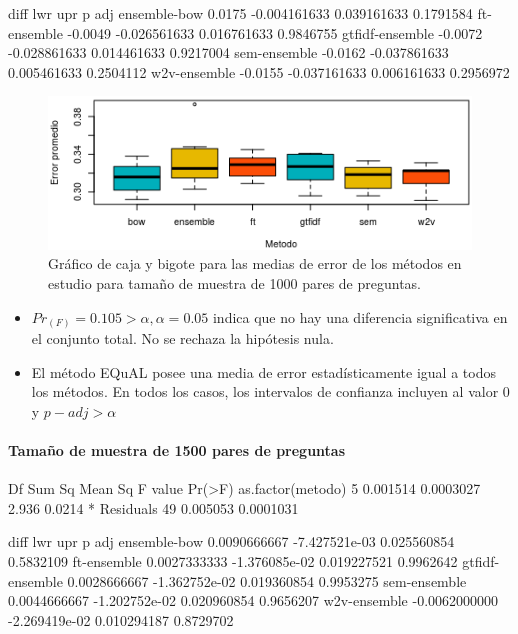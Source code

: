 \begin{rc}
                  diff          lwr         upr     p adj
ensemble-bow     0.0175 -0.004161633 0.039161633 0.1791584
ft-ensemble     -0.0049 -0.026561633 0.016761633 0.9846755
gtfidf-ensemble -0.0072 -0.028861633 0.014461633 0.9217004
sem-ensemble    -0.0162 -0.037861633 0.005461633 0.2504112
w2v-ensemble    -0.0155 -0.037161633 0.006161633 0.2956972
\end{rc}

\begin{figure}
	\centering
	\includegraphics[width=0.7\linewidth]{10_resultados/imagenes/anova_1000}
	\caption{Gráfico de caja y bigote para las medias de error de los métodos en estudio para tamaño de muestra de 1000 pares de preguntas.}
	\label{fig:anova1000}
\end{figure}

\begin{itemize}
	\item \(Pr_(F) = 0.105 > \alpha, \alpha = 0.05\) indica que no hay una diferencia significativa en el conjunto total. No se rechaza la hipótesis nula.
	\item El método EQuAL posee una media de error estadísticamente igual a todos los métodos. En todos los casos, los intervalos de confianza incluyen al valor 0 y \(p-adj > \alpha\)
\end{itemize}

\paragraph{Tamaño de muestra de 1500 pares de preguntas}

\begin{rc}
                 Df   Sum Sq   Mean Sq F value Pr(>F)
as.factor(metodo)  5 0.001514 0.0003027   2.936 0.0214 *
Residuals         49 0.005053 0.0001031
\end{rc}

\begin{rc}
                        diff           lwr         upr     p adj
ensemble-bow     0.0090666667 -7.427521e-03 0.025560854 0.5832109
ft-ensemble      0.0027333333 -1.376085e-02 0.019227521 0.9962642
gtfidf-ensemble  0.0028666667 -1.362752e-02 0.019360854 0.9953275
sem-ensemble     0.0044666667 -1.202752e-02 0.020960854 0.9656207
w2v-ensemble    -0.0062000000 -2.269419e-02 0.010294187 0.8729702
\end{rc}

